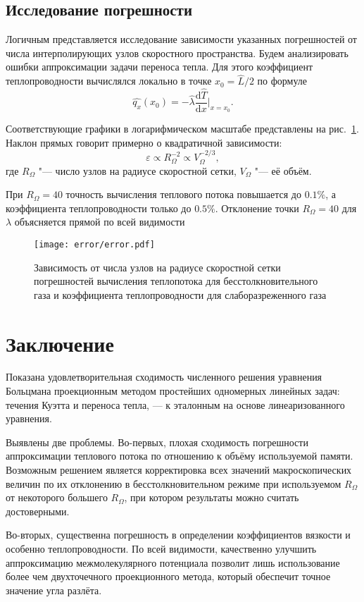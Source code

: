 \documentclass[a4paper,12pt]{article}
\newcommand{\dd}{\mathrm{d}}
\begin{document}
\subsection{Исследование погрешности}

Логичным представляется исследование зависимости указанных погрешностей от числа интерполирующих узлов
скоростного пространства. Будем анализировать ошибки аппроксимации задачи переноса тепла.
Для этого коэффициент теплопроводности вычислялся локально в точке \(x_0=\hat L/2\) по формуле
\[ \hat{q_x}(x_0) = -\hat{\lambda}\frac{\dd\hat T}{\dd x}\bigg|_{x=x_0}. \]

Соответствующие графики в логарифмическом масштабе представлены на рис.~\ref{fig:error}.
Наклон прямых говорит примерно о квадратичной зависимости:
\[ \varepsilon \propto R_\Omega^{-2} \propto V_\Omega^{-2/3}, \]
где \(R_\Omega\) "--- число узлов на радиусе скоростной сетки, \(V_\Omega\) "--- её объём.

При \(R_\Omega = 40\) точность вычисления теплового потока повышается до \(0.1\%\),
а коэффициента теплопроводности только до \(0.5\%\).
Отклонение точки \(R_\Omega = 40\) для \(\lambda\) объясняется прямой по всей видимости

\begin{figure}
    \centering
    \texttt{[image: error/error.pdf]}
    \caption{
        Зависимость от числа узлов на радиусе скоростной сетки погрешностей вычисления
        теплопотока для бесстолкновительного газа и коэффициента теплопроводности для слаборазреженного газа
    }\label{fig:error}
\end{figure}

\section{Заключение}

Показана удовлетворительная сходимость численного решения уравнения Больцмана проекционным методом
простейших одномерных линейных задач: течения Куэтта и переноса тепла, --- к эталонным на основе
линеаризованного уравнения.

Выявлены две проблемы. Во-первых, плохая сходимость погрешности аппроксимации теплового потока по отношению к
объёму используемой памяти. Возможным решением является корректировка всех значений макроскопических величин
по их отклонению в бесстолкновительном режиме при используемом \(R_\Omega\) от некоторого большего \(R_\Omega\),
при котором результаты можно считать достоверными.

Во-вторых, существенна погрешность в определении коэффициентов вязкости и особенно теплопроводности.
По всей видимости, качественно улучшить аппроксимацию межмолекулярного потенциала позволит лишь использование
более чем двухточечного проекционного метода, который обеспечит точное значение угла разлёта.

\appendix
\appendixpage



\printbibliography
\end{document}
